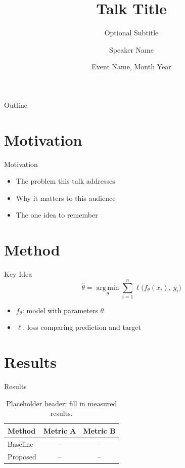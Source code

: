 \documentclass[aspectratio=169]{beamer}
\title{Talk Title}
\subtitle{Optional Subtitle}
\author{Speaker Name}
\institute{Affiliation}
\date{Event Name, Month Year}
\begin{document}
\begin{frame}
  \titlepage
\end{frame}

\begin{frame}{Outline}
  \tableofcontents
\end{frame}

\section{Motivation}
\begin{frame}{Motivation}
  \begin{itemize}
    \item The problem this talk addresses
    \item Why it matters to this audience
    \item The one idea to remember
  \end{itemize}
\end{frame}

\section{Method}
\begin{frame}{Key Idea}
  \begin{equation}
    \hat{\theta} = \operatorname*{arg\,min}_{\theta}
      \sum_{i=1}^{n} \ell\bigl(f_{\theta}(x_i),\, y_i\bigr)
  \end{equation}
  \begin{itemize}
    \item $f_{\theta}$: model with parameters $\theta$
    \item $\ell$: loss comparing prediction and target
  \end{itemize}
\end{frame}

\section{Results}
\begin{frame}{Results}
  \begin{table}
    \centering
    \begin{tabular}{lcc}
      \toprule
      Method   & Metric A & Metric B \\
      \midrule
      Baseline & --       & --       \\
      Proposed & --       & --       \\
      \bottomrule
    \end{tabular}
    \caption{Placeholder header; fill in measured results.}
  \end{table}
\end{frame}
\end{document}
